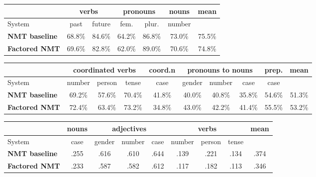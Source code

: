 \documentclass[11pt,letterpaper,final]{article}
\begin{document}
\begin{table*}[!ht]
\begin{center}
\small
\begin{tabular}{ l|cc|cc|c||c }
\hline
& \multicolumn{2}{c}{\textbf{verbs}} & \multicolumn{2}{c}{\textbf{pronouns}} & \multicolumn{1}{c}{\textbf{nouns}}  & \multicolumn{1}{c}{\textbf{mean}} \\
\hline
System & past & future & fem. & plur. & number & \\
\hline
\textbf{NMT baseline}      & 68.8\% & 84.6\% & 64.2\% & 86.8\% & 73.0\% & 75.5\% \\
\textbf{Factored NMT}      & 69.6\% & 82.8\% & 62.0\% & 89.0\% & 70.6\% & 74.8\% \\
\hline
 \end{tabular} 
\caption{\label{table:eval_lv_A} Sentence pair evaluation for English-to-Latvian (A-set).}
\end{center}
\begin{center}
\small
\begin{tabular}{ l|ccc|c|ccc|c||c }
\hline
& \multicolumn{3}{c}{\textbf{coordinated verbs}} & \multicolumn{1}{c}{\textbf{coord.n}} & \multicolumn{3}{c}{\textbf{pronouns to nouns}} & \multicolumn{1}{c}{\textbf{prep.}}  & \multicolumn{1}{c}{\textbf{mean}} \\
\hline
System & number & person & tense & case & gender & number & case & case & \\
\hline
\textbf{NMT baseline}      & 69.2\% & 57.6\% & 70.4\% & 41.8\% & 40.0\% & 40.8\% & 35.8\% & 54.6\% & 51.3\% \\ 
\textbf{Factored NMT}      & 72.4\% & 63.4\% & 73.2\% & 34.8\% & 43.0\% & 42.2\% & 41.4\% & 55.5\% & 53.2\% \\
\hline
 \end{tabular} 
\caption{\label{table:eval_lv_B} Sentence pair evaluation for English-to-Latvian (B-set).}
\end{center}
\begin{center}
\small
\begin{tabular}{ l|c|ccc|ccc||c } 
\hline
& \multicolumn{1}{c}{\textbf{nouns}} & \multicolumn{3}{c}{\textbf{adjectives}} & \multicolumn{3}{c}{\textbf{verbs}} & \multicolumn{1}{c}{\textbf{mean}} \\
\hline
System & case & gender & number & case & number & person & tense & \\
\hline
\textbf{NMT baseline}      & .255 & .616 & .610 & .644 & .139 & .221 & .134 & .374 \\ 
\textbf{Factored NMT}      & .233 & .587 & .582 & .612 & .117 & .182 & .113 & .346 \\
\hline
 \end{tabular} 
\caption{\label{table:eval_lv_C} Sentence group evaluation for English-to-Latvian with Entropy (C-set).}
\end{center}
\end{table*}
\end{document}

